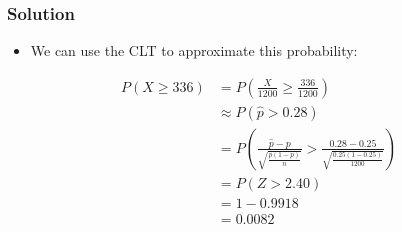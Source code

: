 \documentclass[14pt]{beamer}
\begin{document}
\begin{frame}
	\frametitle{Solution}
	
	\begin{itemize}[label={\color{blue}$\blacktriangleright$}]
		\item We can use the CLT to approximate this probability:
	\end{itemize}
	
	\begin{align*}
		P(X \geq 336) &= P\left(\frac{X}{1200} \geq \frac{336}{1200}\right) \\ 
		&\approx P(\hat{p} > 0.28) \\ 
		&= P\left(\frac{\hat{p} - p}{\sqrt{\frac{p(1-p)}{n}}} > \frac{0.28 - 0.25}{\sqrt{\frac{0.25(1-0.25)}{1200}}}\right) \\ 
		&= P(Z > 2.40) \\ 
		&= 1 - 0.9918 \\ 
		&= 0.0082
	\end{align*}
	
\end{frame}
\end{document}
